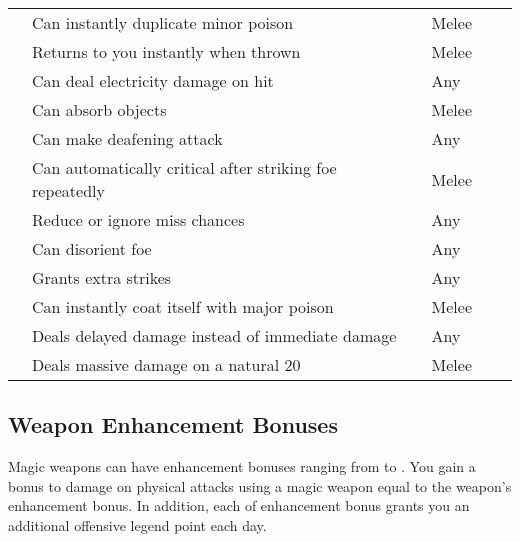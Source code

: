 \begin{longtabuwrapper}
\begin{longtabu}{l X l l l l}
                 & Can instantly duplicate minor poison &  & Melee &  \\
                 & Returns to you instantly when thrown &  & Melee &  \\
                 & Can deal electricity damage on hit &  & Any &  \\
                 & Can absorb objects &  & Melee &  \\
                 & Can make deafening attack &  & Any &  \\
                 & Can automatically critical after striking foe repeatedly &  & Melee &  \\
                 & Reduce or ignore miss chances &  & Any &  \\
                 & Can disorient foe &  & Any &  \\
                 & Grants extra strikes &  & Any &  \\
                 & Can instantly coat itself with major poison &  & Melee &  \\
                 & Deals delayed damage instead of immediate damage &  & Any &  \\
                 & Deals massive damage on a natural 20 &  & Melee &  \\
            \end{longtabu}
        \end{longtabuwrapper}
        \twocolumn

    \subsection{Weapon Enhancement Bonuses}\label{Weapon Enhancement Bonuses}

        Magic weapons can have enhancement bonuses ranging from  to .
        You gain a bonus to damage on physical attacks using a magic weapon equal to the weapon's enhancement bonus.
        In addition, each  of enhancement bonus grants you an additional offensive legend point each day.

